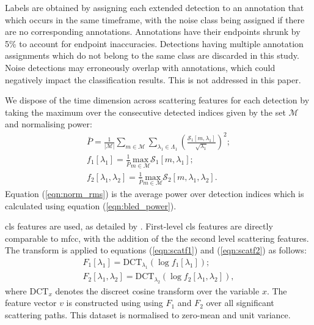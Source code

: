 {Labels are obtained by assigning each extended detection to an annotation that which occurs in the same timeframe, with the noise class being assigned if there are no corresponding annotations. Annotations have their endpoints shrunk by 5\% to account for endpoint inaccuracies. Detections having multiple annotation assignments which do not belong to the same class are discarded in this study. Noise detections may erroneously overlap with annotations, which could negatively impact the classification results. This is not addressed in this paper.

We dispose of the time dimension across scattering features for each detection by taking the maximum over the consecutive detected indices given by the set $\mathcal{M}$ and normalising power:
\begin{gather}
    \label{eqn:norm_rms}
    \bar{P} = \frac{1}{\left| \mathcal{M} \right|}\sum_{m \in \mathcal{M}} \sum_{\lambda_1 \in \Lambda_1} \left(\frac{\mathcal{S}_1[m, \lambda_1]}{\sqrt{\lambda_1}}\right)^2; \\
    \label{eqn:scatf1}
    f_1[\lambda_1] = \frac{1}{\bar{P}}\underset{{m \in \mathcal{M}}}{\text{max}}\mathcal{S}_1[m, \lambda_1]; \\
    \label{eqn:scatf2}
    f_2[\lambda_1, \lambda_2] = \frac{1}{\bar{P}}\underset{{m \in \mathcal{M}}}{\text{max}} \mathcal{S}_2[m, \lambda_1, \lambda_2].    
\end{gather}
Equation (\ref{eqn:norm_rms}) is the average power over detection indices which is calculated using equation (\ref{eqn:bled_power}).

\Ac{cls} features are used, as detailed by \citet{ws_audio}. First-level \ac{cls} features are directly comparable to \ac{mfcc}, with the addition of the the second level scattering features. The transform is applied to equations (\ref{eqn:scatf1}) and (\ref{eqn:scatf2}) as follows:
\begin{gather}
    F_1[\lambda_1] = \text{DCT}_{\lambda_1}\left(\log f_1[\lambda_1]\right); \\
    F_2[\lambda_1, \lambda_2] = \text{DCT}_{\lambda_2}\left(\log f_2[\lambda_1, \lambda_2]\right),    
\end{gather}
where $\text{DCT}_{x}$ denotes the discreet cosine transform over the variable $x$. The feature vector $v$ is constructed using using $F_1$ and $F_2$ over all significant scattering paths. This dataset is normalised to zero-mean and unit variance.

}
